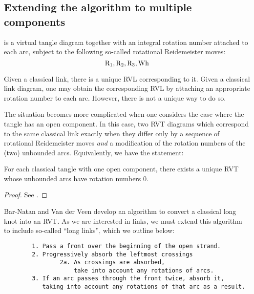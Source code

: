 \documentclass{article}
\begin{document}
\subsection{Extending the algorithm to multiple components}

\begin{definition}[\ac{RVT}]
         is a virtual tangle diagram together with an integral rotation
        number attached to each arc, subject to the following so-called
        rotational Reidemeister moves:
        \begin{equation}
                \Reid1, \Reid2, \Reid3, \text{Wh} %
        \end{equation}
\end{definition}

Given a classical link, there is a unique \ac{RVL} corresponding to it. Given a
classical link diagram, one may obtain the corresponding \ac{RVL} by attaching
an appropriate rotation number to each arc. However, there is not a unique way
to do so.

The situation becomes more complicated when one considers the case where the
tangle has an open component. In this case, two \ac{RVT} diagrams which
correspond to the same classical link exactly when they differ only by a
sequence of rotational Reidemeister moves \emph{and} a modification of the
rotation numbers of the (two) unbounded arcs. Equivalently, we have the
statement:

\begin{lemma}
        For each classical tangle with one open component, there exists a unique
        \ac{RVT} whose unbounded arcs have rotation numbers $0$.
\end{lemma}
\begin{proof}
        See \cite{BV}.
\end{proof}

Bar-Natan and Van der Veen develop an algorithm to convert a classical long knot
into an \ac{RVT}. As we are interested in links, we must extend this algorithm
to include so-called \enquote{long links}, which we outline below:
\begin{verbatim}
        1. Pass a front over the beginning of the open strand.
        2. Progressively absorb the leftmost crossings
                2a. As crossings are absorbed,
                    take into account any rotations of arcs.
        3. If an arc passes through the front twice, absorb it,
           taking into account any rotations of that arc as a result.
\end{verbatim}
\end{document}
